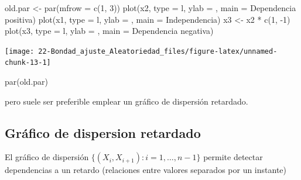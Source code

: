 \documentclass[
]{book}
\newenvironment{Shaded}{\begin{snugshade}}{\end{snugshade}}
\newcommand{\AttributeTok}[1]{\textcolor[rgb]{0.77,0.63,0.00}{#1}}
\newcommand{\DecValTok}[1]{\textcolor[rgb]{0.00,0.00,0.81}{#1}}
\newcommand{\FunctionTok}[1]{\textcolor[rgb]{0.00,0.00,0.00}{#1}}
\newcommand{\NormalTok}[1]{#1}
\newcommand{\OtherTok}[1]{\textcolor[rgb]{0.56,0.35,0.01}{#1}}
\newcommand{\SpecialCharTok}[1]{\textcolor[rgb]{0.00,0.00,0.00}{#1}}
\newcommand{\StringTok}[1]{\textcolor[rgb]{0.31,0.60,0.02}{#1}}
\theoremstyle{break}
\theoremstyle{nonumberplain}
\begin{document}
\begin{Shaded}
\begin{Highlighting}[]
\NormalTok{old.par }\OtherTok{\textless{}{-}} \FunctionTok{par}\NormalTok{(}\AttributeTok{mfrow =} \FunctionTok{c}\NormalTok{(}\DecValTok{1}\NormalTok{, }\DecValTok{3}\NormalTok{))}
\FunctionTok{plot}\NormalTok{(x2, }\AttributeTok{type =} \StringTok{\textquotesingle{}l\textquotesingle{}}\NormalTok{, }\AttributeTok{ylab =} \StringTok{\textquotesingle{}\textquotesingle{}}\NormalTok{, }\AttributeTok{main =} \StringTok{\textquotesingle{}Dependencia positiva\textquotesingle{}}\NormalTok{)}
\FunctionTok{plot}\NormalTok{(x1, }\AttributeTok{type =} \StringTok{\textquotesingle{}l\textquotesingle{}}\NormalTok{, }\AttributeTok{ylab =} \StringTok{\textquotesingle{}\textquotesingle{}}\NormalTok{, }\AttributeTok{main =} \StringTok{\textquotesingle{}Independencia\textquotesingle{}}\NormalTok{)}
\NormalTok{x3 }\OtherTok{\textless{}{-}}\NormalTok{ x2 }\SpecialCharTok{*} \FunctionTok{c}\NormalTok{(}\DecValTok{1}\NormalTok{, }\SpecialCharTok{{-}}\DecValTok{1}\NormalTok{)}
\FunctionTok{plot}\NormalTok{(x3, }\AttributeTok{type =} \StringTok{\textquotesingle{}l\textquotesingle{}}\NormalTok{, }\AttributeTok{ylab =} \StringTok{\textquotesingle{}\textquotesingle{}}\NormalTok{, }\AttributeTok{main =} \StringTok{\textquotesingle{}Dependencia negativa\textquotesingle{}}\NormalTok{)}
\end{Highlighting}
\end{Shaded}

\begin{center}\texttt{[image: 22-Bondad\_ajuste\_Aleatoriedad\_files/figure-latex/unnamed-chunk-13-1]} \end{center}

\begin{Shaded}
\begin{Highlighting}[]
\FunctionTok{par}\NormalTok{(old.par)}
\end{Highlighting}
\end{Shaded}

pero suele ser preferible emplear un gráfico de dispersión retardado.

\hypertarget{gruxe1fico-de-dispersion-retardado}{%
\subsection{Gráfico de dispersion retardado}\label{gruxe1fico-de-dispersion-retardado}}

El gráfico de dispersión \(\{(X_{i},X_{i+1}) : i = 1, \ldots, n-1 \}\) permite
detectar dependencias a un retardo (relaciones entre valores separados
por un instante)
\end{document}

